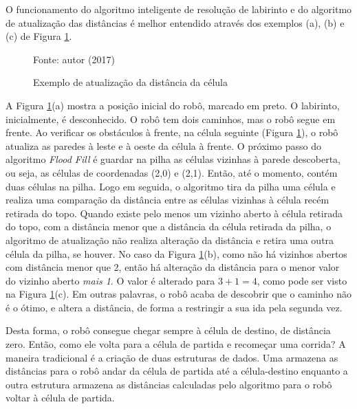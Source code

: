 O funcionamento do algoritmo inteligente de resolução de labirinto e do algoritmo de atualização das distâncias é melhor entendido através dos exemplos (a), (b) e (c) de Figura \ref{fig:atualiza_dist}.

\begin{figure}[!htb]
	\caption[Exemplo de atualização da distância da célula]{\label{fig:atualiza_dist}Exemplo de atualização da distância da célula}
	\begin{center}
		\hspace*{0.05\linewidth}
		\hspace*{0.05\linewidth}
	\end{center}
	\centering
	\small Fonte: autor (2017)
\end{figure}

A Figura \ref{fig:atualiza_dist}(a) mostra a posição inicial do robô, marcado em preto. O labirinto, inicialmente, é desconhecido. O robô tem dois caminhos, mas o robô segue em frente. Ao verificar os obstáculos à frente, na célula seguinte (Figura \ref{fig:atualiza_dist}), o robô atualiza as paredes à leste e à oeste da célula à frente. O próximo passo do algoritmo \emph{Flood Fill} é guardar na pilha as células vizinhas à parede descoberta, ou seja, as células de coordenadas (2,0) e (2,1). Então, até o momento, contém duas células na pilha. Logo em seguida, o algoritmo tira da pilha uma célula e realiza uma comparação da distância entre as células vizinhas à célula recém retirada do topo. Quando existe pelo menos um vizinho aberto à célula retirada do topo, com a distância menor que a distância da célula retirada da pilha, o algoritmo de atualização não realiza alteração da distância e retira uma outra célula da pilha, se houver. No caso da Figura \ref{fig:atualiza_dist}(b), como não há vizinhos abertos com distância menor que 2, então há alteração da distância para o menor valor do vizinho aberto \emph{mais 1}. O valor é alterado para $3 + 1 = 4$, como pode ser visto na Figura \ref{fig:atualiza_dist}(c). Em outras palavras, o robô acaba de descobrir que o caminho não é o ótimo, e altera a distância, de forma a restringir a sua ida pela segunda vez.
	
Desta forma, o robô consegue chegar sempre à célula de destino, de distância zero. Então, como ele volta para a célula de partida e recomeçar uma corrida? A maneira tradicional é a criação de duas estruturas de dados. Uma armazena as distâncias para o robô andar da célula de partida até a célula-destino enquanto a outra estrutura armazena as distâncias calculadas pelo algoritmo para o robô voltar à célula de partida. 
	
